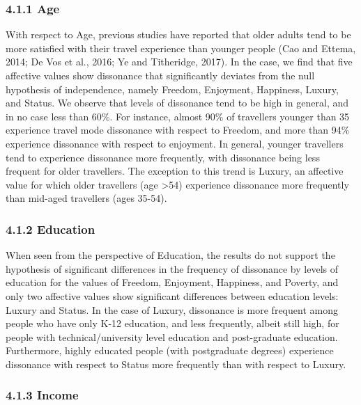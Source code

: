 \documentclass[]{elsarticle} %
\begin{document}
\hypertarget{age}{%
\subsubsection{4.1.1 Age}\label{age}}

With respect to Age, previous studies have reported that older adults
tend to be more satisfied with their travel experience than younger
people (Cao and Ettema, 2014; De Vos et al., 2016; Ye and Titheridge,
2017). In the case, we find that five affective values show dissonance
that significantly deviates from the null hypothesis of independence,
namely Freedom, Enjoyment, Happiness, Luxury, and Status. We observe
that levels of dissonance tend to be high in general, and in no case
less than 60\%. For instance, almost 90\% of travellers younger than 35
experience travel mode dissonance with respect to Freedom, and more than
94\% experience dissonance with respect to enjoyment. In general,
younger travellers tend to experience dissonance more frequently, with
dissonance being less frequent for older travellers. The exception to
this trend is Luxury, an affective value for which older travellers (age
\textgreater54) experience dissonance more frequently than mid-aged
travellers (ages 35-54).

\hypertarget{education}{%
\subsubsection{4.1.2 Education}\label{education}}

When seen from the perspective of Education, the results do not support
the hypothesis of significant differences in the frequency of dissonance
by levels of education for the values of Freedom, Enjoyment, Happiness,
and Poverty, and only two affective values show significant differences
between education levels: Luxury and Status. In the case of Luxury,
dissonance is more frequent among people who have only K-12 education,
and less frequently, albeit still high, for people with
technical/university level education and post-graduate education.
Furthermore, highly educated people (with postgraduate degrees)
experience dissonance with respect to Status more frequently than with
respect to Luxury.

\hypertarget{income}{%
\subsubsection{4.1.3 Income}\label{income}}
\end{document}
